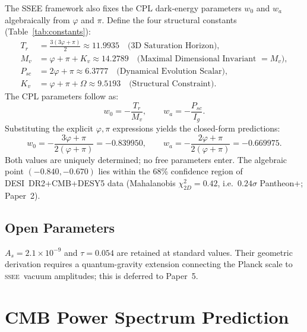 \documentclass[12pt,a4paper]{article}
\newcommand{\SSEE}{\ifmmode\mathrm{SSEE}\else\textsc{ssee}\fi}
\begin{document}
The SSEE framework also fixes the CPL dark-energy parameters $w_0$ and $w_a$
algebraically from $\varphi$ and $\pi$.
Define the four structural constants (Table~\ref{tab:constants}):
\begin{align}
  T_r    &= \tfrac{3(3\varphi+\pi)}{2} \approx 11.9935 \quad \text{(3D Saturation Horizon)}, \\
  M_v    &= \varphi+\pi+K_v            \approx 14.2789 \quad \text{(Maximal Dimensional Invariant $= M_v$)}, \\
  P_{sc} &= 2\varphi+\pi               \approx  6.3777 \quad \text{(Dynamical Evolution Scalar)}, \\
  K_v    &= \varphi+\pi+\Omega         \approx  9.5193 \quad \text{(Structural Constraint)}.
\end{align}
The CPL parameters follow as:
\begin{equation}
  w_0 = -\frac{T_r}{M_v}, \qquad w_a = -\frac{P_{sc}}{I_g}.
\end{equation}
Substituting the explicit $\varphi,\pi$ expressions yields the closed-form predictions:
\begin{equation}
  \boxed{w_0 = -\frac{3\varphi+\pi}{2(\varphi+\pi)} = -0.839950},
  \qquad
  \boxed{w_a = -\frac{2\varphi+\pi}{2(\varphi+\pi)} = -0.669975}.
  \label{eq:w0wa_p4}
\end{equation}
Both values are uniquely determined; no free parameters enter.
The algebraic point $(-0.840,-0.670)$ lies within the 68\% confidence region
of DESI~DR2+CMB+DESY5 data \citep{desidr2_2025}
(Mahalanobis $\chi^2_{2D}=0.42$, i.e.\ $0.24\sigma$ Pantheon+; Paper~2).

\subsection{Open Parameters}

$A_s = 2.1\times10^{-9}$ and $\tau = 0.054$ are retained at standard values.
Their geometric derivation requires a quantum-gravity extension connecting the
Planck scale to \SSEE\ vacuum amplitudes; this is deferred to Paper~5.

\section{CMB Power Spectrum Prediction}
\label{sec:cmb}
\end{document}
